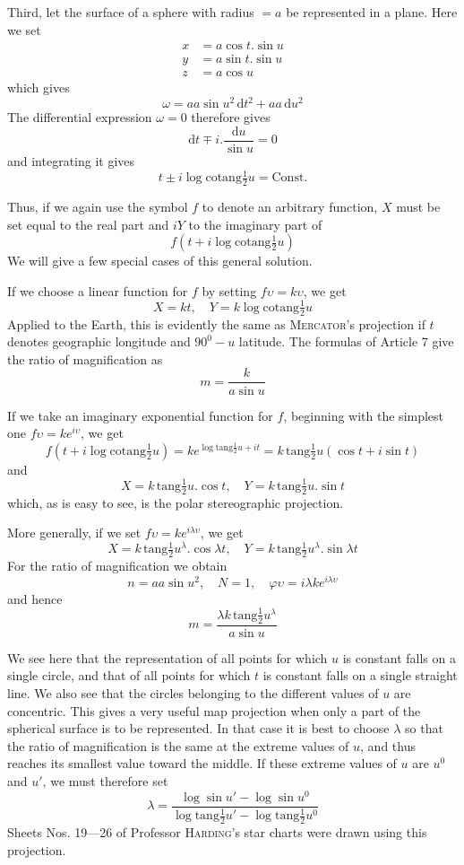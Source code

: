 Third, let the surface of a sphere with radius \(=a\) be represented in a plane. Here we set
\[
\begin{aligned}
x&=a\cos t\mathord{.}\sin u\\
y&=a\sin t\mathord{.}\sin u\\
z&=a\cos u
\end{aligned}
\]
\noindent which gives
\[
\omega=aa\sin u^2\,\mathrm{d}t^2+aa\,\mathrm{d}u^2
\]
\noindent The differential expression \(\omega=0\) therefore gives
\[
\mathrm{d}t\mp i\mathord{.}\frac{\mathrm{d}u}{\sin u}=0
\]
\noindent and integrating it gives
\[
t\pm i\log\mathrm{cotang}\tfrac{1}{2}u=\text{Const.}
\]
\par\indent{}%
Thus, if we again use the symbol \(f\) to denote an arbitrary function, \(X\) must be set equal to the real part and \(iY\) to the imaginary part of
\[
f(t+i\log\mathrm{cotang}\tfrac{1}{2}u)
\]
\noindent We will give a few special cases of this general solution.

If we choose a linear function for \(f\) by setting \(f\upsilon=k\upsilon\), we get
\[
X=kt,\quad Y=k\log\mathrm{cotang}\tfrac{1}{2}u
\]
\noindent Applied to the Earth, this is evidently the same as \textsc{Mercator}'s projection if \(t\) denotes geographic longitude and \(90^0-u\) latitude. The formulas of Article 7 give the ratio of magnification as
\[
m=\frac{k}{a\sin u}
\]

If we take an imaginary exponential function for \(f\), beginning with the simplest one \(f\upsilon=ke^{i\upsilon}\), we get
\[
f(t+i\log\mathrm{cotang}\tfrac{1}{2}u)=ke^{\log\mathrm{tang}\frac{1}{2}u+it}=k\,\mathrm{tang}\tfrac{1}{2}u(\cos t+i\sin t)
\]
\noindent and
\[
X=k\,\mathrm{tang}\tfrac{1}{2}u\mathord{.}\cos t,\quad
Y=k\,\mathrm{tang}\tfrac{1}{2}u\mathord{.}\sin t
\]
\noindent which, as is easy to see, is the polar stereographic projection.

More generally, if we set \(f\upsilon=ke^{i\lambda\upsilon}\), we get
\[
X=k\,\mathrm{tang}\tfrac{1}{2}u^{\lambda}\mathord{.}\cos\lambda t,\quad
Y=k\,\mathrm{tang}\tfrac{1}{2}u^{\lambda}\mathord{.}\sin\lambda t
\]
\noindent For the ratio of magnification we obtain
\[
n=aa\sin u^2,\quad N=1,\quad\varphi\upsilon=i\lambda ke^{i\lambda\upsilon}
\]
\noindent and hence
\[
m=\frac{\lambda k\,\mathrm{tang}\frac{1}{2}u^{\lambda}}{a\sin u}
\]

We see here that the representation of all points for which \(u\) is constant falls on a single circle, and that of all points for which \(t\) is constant falls on a single straight line. We also see that the circles belonging to the different values of \(u\) are concentric. This gives a very useful map projection when only a part of the spherical surface is to be represented. In that case it is best to choose \(\lambda\) so that the ratio of magnification is the same at the
extreme values of \(u\), and thus reaches its smallest value toward the middle. If these extreme values of \(u\) are \(u^0\) and \(u'\), we must therefore set
\[
\lambda=\frac{\log\sin u'-\log\sin u^0}{\log\mathrm{tang}\frac{1}{2}u'-\log\mathrm{tang}\frac{1}{2}u^0}
\]
\noindent Sheets Nos. 19---26 of Professor \textsc{Harding}'s star charts were drawn using this projection.


